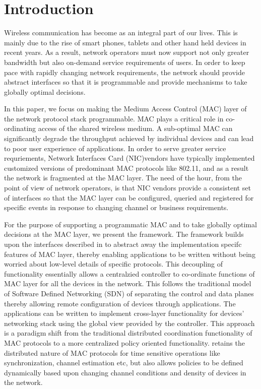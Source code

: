 \section{Introduction}
\label{sec:intro}
Wireless communication has become as an integral part of our lives. This is mainly due to the rise of smart phones, tablets and other hand held devices in recent years. As a result, network operators must now support not only greater bandwidth but also on-demand service requirements of users. In order to keep pace with rapidly changing network requirements, the network should provide abstract interfaces so that it is programmable and provide mechanisms to take globally optimal decisions.

In this paper, we focus on making the Medium Access Control (MAC) layer of the network protocol stack programmable. MAC plays a critical role in co-ordinating access of the shared wireless medium. A sub-optimal MAC can significantly degrade the throughput achieved by individual devices and can lead to poor user experience of applications. In order to serve greater service requriements, Network Interfaces Card (NIC)vendors have typically implemented  customized versions of predominant MAC protocols like 802.11, and as a result the network is fragmented at the MAC layer. The need of the hour, from the point of view of network operators, is that NIC vendors provide a consistent set of interfaces so that the MAC layer can be configured, queried and registered for specific events in response to changing channel or business requirements.

For the purpose of supporting a programmatic MAC and to take globally optimal decisions at the MAC layer, we present the \pmac framework. The framework builds upon the interfaces described in \cite{macproc} to abstract away the implementation specifc features of MAC layer, thereby enabling applications to be written without being worried about low-level details of specific protocols. This decoupling of functionality essentially allows a centralzied controller to co-ordinate functions of MAC layer for all the devices in the network. This follows the traditional model of Software Defined Networking (SDN) of separating the control and data planes thereby allowing remote configuration of devices through applications. The applications can be written to implement cross-layer functionality for devices' networking stack using the global view provided by the controller. This approach is a paradigm shift from the traditional distributed coordination functionality of MAC protocols to a more centralized policy oriented  functionality. \pmac retains the distributed nature of MAC protocols for time sensitive operations like synchronization, channel estimation etc, but also allows policies to be defined dynamically based upon changing channel conditions and density of devices in the network.  

